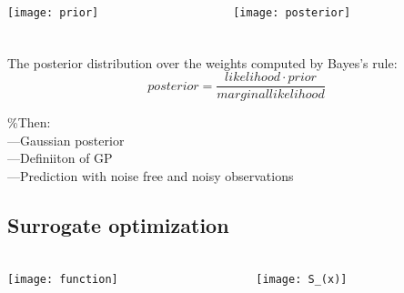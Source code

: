 \documentclass[t]{beamer}
\begin{document}
\begin{frame}
\frametitle{\insertsection}
\framesubtitle{\insertsubsection}
\begin{columns}[T] %
\begin{column}[T]{6cm} %
\texttt{[image: prior]}
\end{column}
\begin{column}[T]{6cm}
\texttt{[image: posterior]}
\end{column}
\end{columns}
\end{frame}


\begin{frame}
\frametitle{\insertsection}
\framesubtitle{\insertsubsection}
The posterior distribution over the weights computed by Bayes's rule:
$$ posterior = \frac{likelihood \cdot{ prior }}{marginal likelihood} $$\pause

\%Then: \\
---Gaussian posterior\\
---Definiiton of GP\\
---Prediction with noise free and noisy observations\\
\end{frame}





\subsection{Surrogate optimization}

\begin{frame}
\frametitle{\insertsection}
\framesubtitle{\insertsubsection}
\begin{columns}[T] %
\begin{column}[T]{6cm} %
\texttt{[image: function]}
\end{column}
\begin{column}[T]{6cm}
\texttt{[image: S\_(x)]}
\end{column}
\end{columns}
\end{frame}
\end{document}
